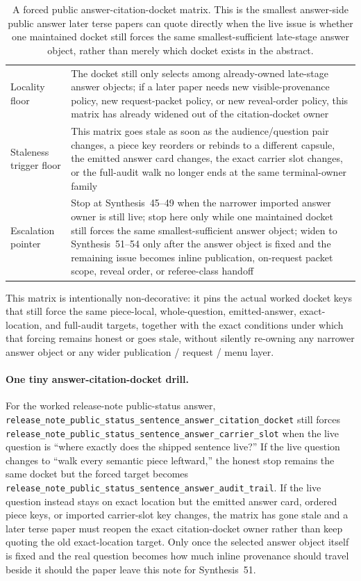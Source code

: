 \documentclass[11pt]{article}
\begin{document}
\begin{table}[t]
\begin{tabularx}{\linewidth}{@{}lX@{}}
Locality floor & The docket still only selects among already-owned late-stage answer objects; if a later paper needs new visible-provenance policy, new request-packet policy, or new reveal-order policy, this matrix has already widened out of the citation-docket owner \\
Staleness trigger floor & This matrix goes stale as soon as the audience/question pair changes, a piece key reorders or rebinds to a different capsule, the emitted answer card changes, the exact carrier slot changes, or the full-audit walk no longer ends at the same terminal-owner family \\
Escalation pointer & Stop at Synthesis~45--49 when the narrower imported answer owner is still live; stop here only while one maintained docket still forces the same smallest-sufficient answer object; widen to Synthesis~51--54 only after the answer object is fixed and the remaining issue becomes inline publication, on-request packet scope, reveal order, or referee-class handoff \\
\bottomrule
\end{tabularx}
\caption{A forced public answer-citation-docket matrix. This is the smallest answer-side public answer later terse papers can quote directly when the live issue is whether one maintained docket still forces the same smallest-sufficient late-stage answer object, rather than merely which docket exists in the abstract.}
\label{tab:forced-public-answer-citation-docket-matrix}
\end{table}

This matrix is intentionally non-decorative: it pins the actual worked docket keys that still force the same piece-local, whole-question, emitted-answer, exact-location, and full-audit targets, together with the exact conditions under which that forcing remains honest or goes stale, without silently re-owning any narrower answer object or any wider publication / request / menu layer.\cite{series:workedexample}

\paragraph{One tiny answer-citation-docket drill.}
For the worked release-note public-status answer, \nolinkurl{release_note_public_status_sentence_answer_citation_docket} still forces \nolinkurl{release_note_public_status_sentence_answer_carrier_slot} when the live question is ``where exactly does the shipped sentence live?'' If the live question changes to ``walk every semantic piece leftward,'' the honest stop remains the same docket but the forced target becomes \nolinkurl{release_note_public_status_sentence_answer_audit_trail}. If the live question instead stays on exact location but the emitted answer card, ordered piece keys, or imported carrier-slot key changes, the matrix has gone stale and a later terse paper must reopen the exact citation-docket owner rather than keep quoting the old exact-location target. Only once the selected answer object itself is fixed and the real question becomes how much inline provenance should travel beside it should the paper leave this note for Synthesis~51.\cite{series:workedexample}
\end{document}
